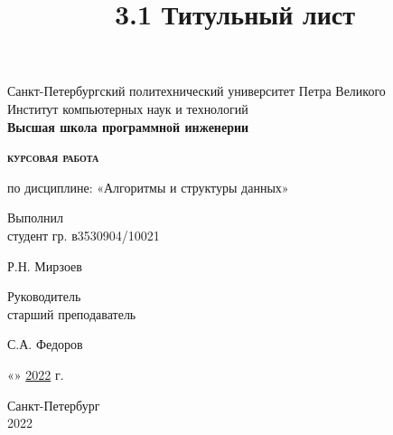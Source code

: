 \documentclass[12pt, a4paper]{report}
\title{3.1 Титульный лист}
\begin{document}
\thispagestyle{empty}	%

\begin{center}
	Санкт-Петербургский политехнический университет Петра Великого\\
	Институт компьютерных наук и технологий\\
	\bfseries{Высшая школа программной инженерии}
\end{center}

\vspace{20ex} %

\begin{center}
	\begin{huge} {\bfseries{\scshape курсовая работа}} \end{huge}

	\vspace{3ex}

	по дисциплине: «Алгоритмы и структуры данных»
\end{center}

\vspace{30ex}

\noindent Выполнил\\
студент гр. в3530904/10021\hfill \begin{minipage}{0.6\textwidth} \hfill Р.Н.
Мирзоев\end{minipage}

\vspace{3ex}

\noindent Руководитель\\
старший преподаватель\hfill \begin{minipage} {0.6\textwidth}\hfill С.А. Федоров\end{minipage}

\vspace{3ex}

\hfill \begin{minipage}{0.6\textwidth} \hfill «\underline{\hspace{0.2cm}{25}\hspace{0.2cm}}»\underline{\hspace{0.2cm}{мая}\hspace{0.2cm}} \underline{2022} г.\end{minipage}

\vfill

\begin{center}
	Санкт-Петербург\\ 
	2022
\end{center}
\end{document}
